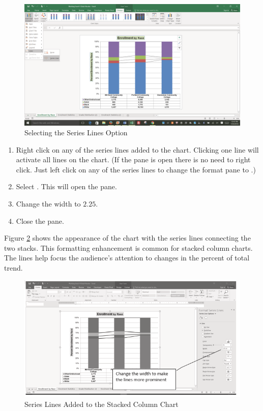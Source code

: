 \begin{figure}[H]
	\centering
	\includegraphics[width=\maxwidth{.95\linewidth}]{gfx/ch04_fig39}
	\caption{Selecting the Series Lines Option}
	\label{04:fig39}
\end{figure}

\begin{enumerate}
	\item Right click on any of the series lines added to the chart. Clicking one line will activate all lines on the chart. (If the  pane is open there is no need to right click. Just left click on any of the series lines to change the format pane to .)
	\item Select . This will open the  pane.
	\item Change the width to $ 2.25 $.
	\item Close the  pane.
\end{enumerate}

Figure \ref{04:fig40} shows the appearance of the chart with the series lines connecting the two stacks. This formatting enhancement is common for stacked column charts. The lines help focus the audience's attention to changes in the percent of total trend.

\begin{figure}[H]
	\centering
	\includegraphics[width=\maxwidth{.95\linewidth}]{gfx/ch04_fig40}
	\caption{Series Lines Added to the Stacked Column Chart}
	\label{04:fig40}
\end{figure}

